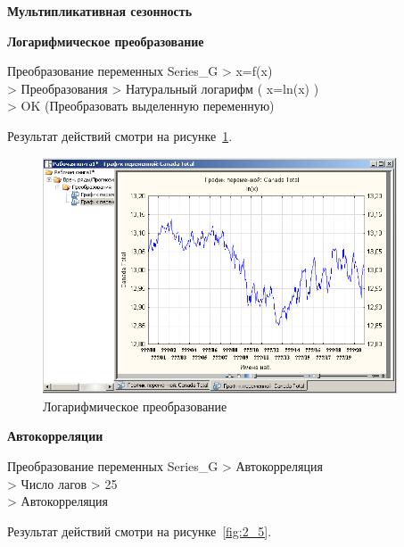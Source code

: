\begin{center}
  \textbf{Мультипликативная сезонность}
\end{center}


\begin{center}
  \textbf{Логарифмическое преобразование}
\end{center}

Преобразование переменных Series\_G > x=f(x)\\
> Преобразования > Натуральный логарифм ( x=ln(x) )\\
> OK (Преобразовать выделенную переменную)

Результат действий смотри на рисунке~\ref{fig:2_4}.

\begin{figure}[!h]
  \centering

  \includegraphics[height=7cm]
  {inc/Canada_Gas_Production/4.PNG}

  \caption{Логарифмическое преобразование}

  \label{fig:2_4}
\end{figure}

\begin{center}
  \textbf{Автокорреляции}
\end{center}

Преобразование переменных Series\_G > Автокорреляция\\
> Число лагов > 25\\
> Автокорреляция

Результат действий смотри на рисунке~\ref{fig:2_5}.

